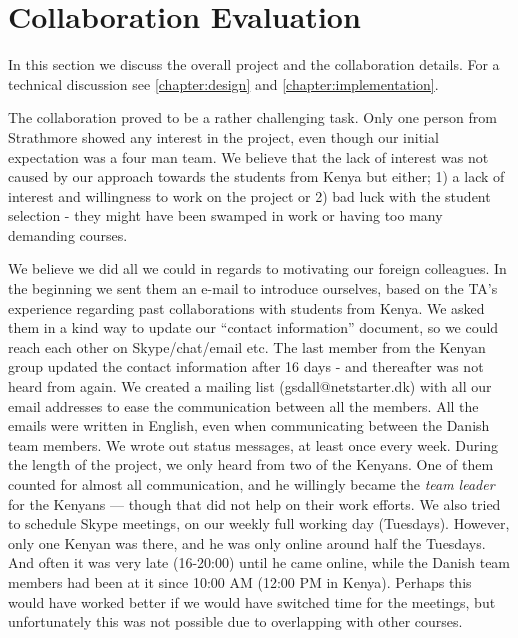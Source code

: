 \section{Collaboration Evaluation}\label{sec:discussioncollaboration}
In this section we discuss the overall project and the collaboration details. For a technical discussion see \ref{chapter:design} and \ref{chapter:implementation}. 

The collaboration proved to be a rather challenging task. Only one person from Strathmore showed any interest in the project, even though our initial expectation was a four man team. We believe that the lack of interest was not caused by our approach towards the students from Kenya but either; 1) a lack of interest and willingness to work on the project or 2) bad luck with the student selection - they might have been swamped in work or having too many demanding courses.

We believe we did all we could in regards to motivating our foreign colleagues. In the beginning we sent them an e-mail to introduce ourselves, based on the TA's experience regarding past collaborations with students from Kenya. We asked them in a kind way to update our ``contact information'' document, so we could reach each other on Skype/chat/email etc. The last member from the Kenyan group updated the contact information after 16 days - and thereafter was not heard from again. We created a mailing list (gsdall@netstarter.dk) with all our email addresses to ease the communication between all the members. All the emails were written in English, even when communicating between the Danish team members. We wrote out status messages, at least once every week. During the length of the project, we only heard from two of the Kenyans. One of them counted for almost all communication, and he willingly became the \textit{team leader} for the Kenyans --- though that did not help on their work efforts. We also tried to schedule Skype meetings, on our weekly full working day (Tuesdays). However, only one Kenyan was there, and he was only online around half the Tuesdays. And often it was very late (16-20:00) until he came online, while the Danish team members had been at it since 10:00 AM (12:00 PM in Kenya). Perhaps this would have worked better if we would have switched time for the meetings, but unfortunately this was not possible due to overlapping with other courses.

